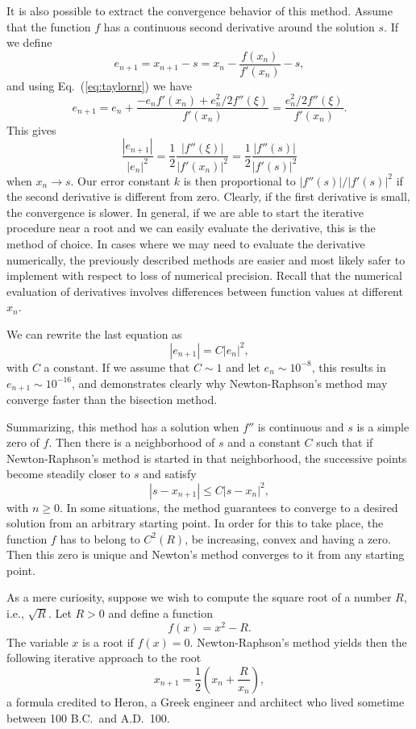 It is also possible to extract the convergence behavior 
of this method. Assume that the function $f$ has a continuous
second derivative around the solution $s$. 
If we define
\[
    e_{n+1}=x_{n+1}-s=x_n-\frac{f(x_n)}{f'(x_n)}-s,
\]
and
using Eq.\ (\ref{eq:taylornr}) we have
\[
   e_{n+1}=e_{n}+\frac{-e_nf'(x_n)+e_n^2/2f''(\xi)}{f'(x_n)}=
           \frac{e_n^2/2f''(\xi)}{f'(x_n)}.
\]
This gives
\[
   \frac{|e_{n+1}|}{|e_n|^2}=\frac{1}{2}\frac{|f''(\xi)|}{|f'(x_n)|^2}=
   \frac{1}{2}\frac{|f''(s)|}{|f'(s)|^2}
\]
when $x_n\rightarrow s$. Our error constant $k$ is then
proportional  to $|f''(s)|/|f'(s)|^2$ if the second derivative
is different from zero.
Clearly, if the first derivative is small, the convergence
is slower. In general, if we are able to start
the iterative procedure near a root and we can easily
evaluate the derivative, this is the method of choice.
In cases where we may need to evaluate the derivative
numerically, the previously described methods are easier
and most likely safer to implement with respect to
loss of numerical precision. Recall that the numerical
evaluation of derivatives involves differences between function
values at different $x_n$. 

We can rewrite the last equation as
\[
   |e_{n+1}| =C|e_n|^2,
\]
with $C$ a constant.
If we assume that $C\sim 1$ and let $e_{n}\sim 10^{-8}$,
this results in $e_{n+1}\sim 10^{-16}$, and demonstrates clearly why
Newton-Raphson's method may converge faster than the bisection method. 

Summarizing, this method has a solution when $f''$ is continuous and $s$ is
a simple zero of $f$. Then there is a neighborhood of $s$ and a constant 
$C$ such that if Newton-Raphson's method is started in that neighborhood,
the successive points become steadily closer to $s$ and satisfy
\[
   |s-x_{n+1}| \le C|s-x_n|^2,
\]
with $n \ge 0$. 
In some situations, the method guarantees to converge to a desired solution
from an arbitrary starting point. In order for this to take place, the 
function $f$ has to belong to $C^2(R)$, be increasing, convex 
and having a zero. Then this zero is unique and Newton's method converges
to it from any starting point.    

As a mere curiosity, suppose we wish to compute the square root of 
a number $R$, i.e., $\sqrt{R}$. Let $R > 0$ and define a function
\[
  f(x)=x^2-R.
\]
The variable $x$ is a root if $f(x)=0$. Newton-Raphson's method
yields then the following iterative approach to the root
\[
   x_{n+1}=\frac{1}{2}\left(x_n+\frac{R}{x_n}\right),
\]
a formula credited to Heron, a Greek engineer and architect who lived 
sometime between 100 B.C.~and A.D.~100.

